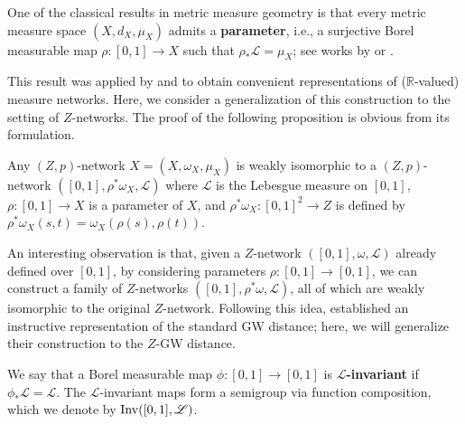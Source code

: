 \documentclass[twoside,11pt]{article}
\theoremstyle{definition}
\newcommand{\R}{\mathbb{R}}
\newcommand{\define}[1]{\textbf{#1}}
\begin{document}
One of the classical results in metric measure geometry is that every metric measure space $(X,d_X,\mu_X)$ admits a \define{parameter}, i.e., a surjective Borel measurable map $\rho:[0,1]\to X$ such that $\rho_*\mathscr{L}=\mu_X$; see works by  \citet[Section 3$\frac{1}{2}$.3]{Gromov2006Metric} or \citet[Lemma 4.2]{Shioya2016Metric}.



This result was applied by \citet{chowdhury2019gromov} and \citet{sturm2023space} to obtain convenient representations of ($\R$-valued) measure networks.  Here, we consider a generalization of this construction to the setting of $Z$-networks. The proof of the following proposition is obvious from its formulation.

\begin{proposition}[Parametrization]
    \label{rem: interval representation} Any $(Z,p)$-network $X=(X,\omega_X, \mu_X)$ is weakly isomorphic to a $(Z,p)$-network $([0,1], \rho^*\omega_X, \mathscr{L})$ where $\mathscr{L}$ is the Lebesgue measure on $[0,1]$, $\rho:[0,1]\to X$ is a parameter of $X$, and $\rho^*\omega_X:[0,1]^2\to Z$ is defined by $\rho^*\omega_X(s,t)=\omega_X(\rho(s),\rho(t))$.
\end{proposition}

An interesting observation is that, given a $Z$-network $([0,1],\omega,\mathscr{L})$ already defined over $[0,1]$, by considering parameters $\rho:[0,1]\to[0,1]$, we can construct a family of $Z$-networks $([0,1],\rho^*\omega,\mathscr{L})$, all of which are weakly isomorphic to the original $Z$-network. Following this idea, \citet{sturm2023space} established an instructive representation of the standard GW distance; here, we will generalize their construction to the $Z$-GW distance.

\begin{definition}
    We say that a Borel measurable map $\phi:[0,1]\to [0,1]$ is \define{$\mathscr{L}$-invariant} if $\phi_* \mathscr{L}=\mathscr{L}$. The $\mathscr{L}$-invariant maps form a semigroup via function composition, which we denote by $\textnormal{Inv}([0,1],\mathscr{L})$. 
\end{definition}
\end{document}
